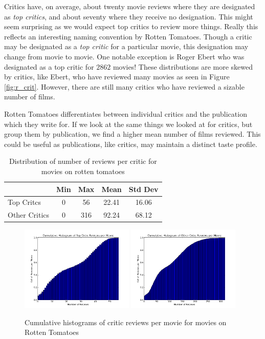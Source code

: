 \documentclass[12pt]{article}
\begin{document}
	Critics have, on average, about twenty movie reviews where they are designated as \textit{top critics}, and about seventy where they receive no designation. This might seem surprising as we would expect top critics to review more things. Really this reflects an interesting naming convention by Rotten Tomatoes. Though a critic may be designated as a \textit{top critic} for a particular movie, this designation may change from movie to movie. One notable exception is Roger Ebert who was designated as a top critic for $2862$ movies! These distributions are more skewed by critics, like Ebert, who have reviewed many movies as seen in Figure \ref{fig:r_crit}. However, there are still many critics who have reviewed a sizable number of films.

	Rotten Tomatoes differentiates between individual critics and the publication which they write for. If we look at the same things we looked at for critics, but group them by publication, we find a higher mean number of films reviewed. This could be useful as publications, like critics, may maintain a distinct taste profile.

	\begin{table}[H]
	 \centering
	 \caption{Distribution of number of reviews per critic for movies on rotten tomatoes}
	 \begin{tabular}{ l | c | c | c | c }
	 \hline
	 &  Min & Max & Mean & Std Dev  \\
	 \hline
	 Top Critcs & 0 & 56 & 22.41 & 16.06 \\
	 Other Critics & 0 & 316 & 92.24 & 68.12 \\
	 \hline
	 \end{tabular}
	 \end{table}

	\begin{figure}[H]
	    \centering
	    \includegraphics[width=0.48\textwidth]{plots/plot_r_mov_top.png}
	    \includegraphics[width=0.48\textwidth]{plots/plot_r_mov_oth.png}
	    \caption{Cumulative histograms of critic reviews per movie for movies on Rotten Tomatoes}
	    \label{fig:r_mov} 
	\end{figure}
\end{document}

